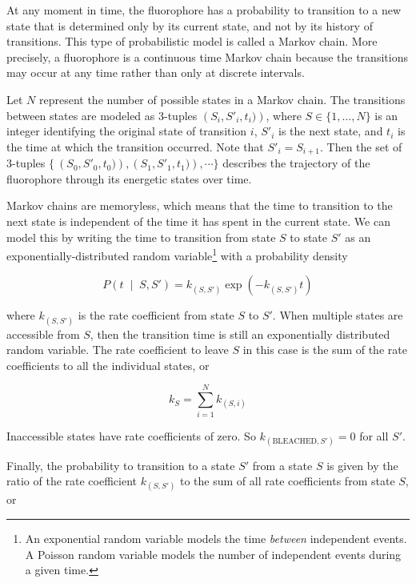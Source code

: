 \documentclass[10pt,a4paper,oneside]{book}
\newcommand{\given}{\;\middle|\;}
\begin{document}
At any moment in time, the fluorophore has a probability to transition to a new state that is determined only by its current state, and not by its history of transitions. This type of probabilistic model is called a Markov chain. More precisely, a fluorophore is a continuous time Markov chain because the transitions may occur at any time rather than only at discrete intervals.

Let $N$ represent the number of possible states in a Markov chain. The transitions between states are modeled as 3-tuples $\left(S_{i}, S'_{i}, t_i)\right)$, where $S \in \{ 1, \ldots, N \} $ is an integer identifying the original state of transition $i$, $S'_{i}$ is the next state, and $t_i$ is the time at which the transition occurred. Note that $S'_{i} = S_{i + 1}$. Then the set of 3-tuples $\{\ \left(S_{0}, S'_{0}, t_0)\right), \left(S_{1}, S'_{1}, t_{1})\right), \cdots \}$ describes the trajectory of the fluorophore through its energetic states over time.

Markov chains are memoryless, which means that the time to transition to the next state is independent of the time it has spent in the current state. We can model this by writing the time to transition from state $S$ to state $S'$ as an exponentially-distributed random variable\footnote{An exponential random variable models the time \textit{between} independent events. A Poisson random variable models the number of independent events during a given time.} with a probability density

\begin{equation}
    P \left(t \given S, S' \right) = k_{ \left( S, S' \right)} \exp \left( -k_{ \left( S, S' \right) } t \right)
\end{equation}

\noindent where $k_{ \left( S, S' \right)}$ is the rate coefficient from state $S$ to $S'$. When multiple states are accessible from $S$, then the transition time is still an exponentially distributed random variable. The rate coefficient to leave $S$ in this case is the sum of the rate coefficients to all the individual states, or

\begin{equation}
    k_S = \sum_{i = 1}^N k_{ \left( S, i \right) }
\end{equation}

\noindent Inaccessible states have rate coefficients of zero. So $k_{\left( \text{BLEACHED}, S' \right)} = 0$ for all $S'$.

Finally, the probability to transition to a state $S'$ from a state $S$ is given by the ratio of the rate coefficient $k_{ \left( S, S'\right)}$ to the sum of all rate coefficients from state $S$, or
\end{document}
